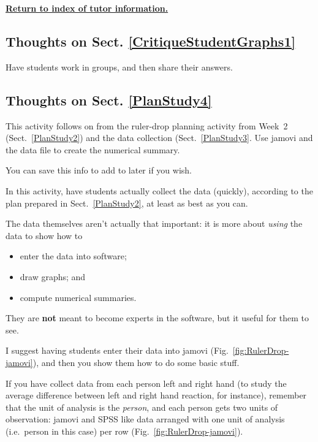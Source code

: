 \documentclass[
  11pt,
  a4paper,
  krantz2]{krantz}
\providecommand{\tightlist}{%
  \setlength{\itemsep}{0pt}\setlength{\parskip}{0pt}}
\begin{document}
\href{TutorInfo.html}{\textbf{Return to index of tutor information.}}

\subsection{Thoughts on Sect. \ref{CritiqueStudentGraphs1}}\label{thoughts-on-sect.-refcritiquestudentgraphs1}

Have students work in groups, and then share their answers.

\subsection{Thoughts on Sect. \ref{PlanStudy4}}\label{thoughts-on-sect.-refplanstudy4}

This activity follows on from the ruler-drop planning activity from Week~2 (Sect.~\ref{PlanStudy2}) and the data collection (Sect.~\ref{PlanStudy3}.
Use jamovi and the data file to create the numerical summary.

You can save this info to add to later if you wish.

In this activity, have students actually collect the data (quickly), according to the plan prepared in Sect.~\ref{PlanStudy2}, at least as best as you can.

The data themselves aren't actually that important: it is more about \emph{using} the data to show how to

\begin{itemize}
\tightlist
\item
  enter the data into software;
\item
  draw graphs; and
\item
  compute numerical summaries.
\end{itemize}

They are \textbf{not} meant to become experts in the software, but it useful for them to see.

I suggest having students enter their data into jamovi (Fig.~\ref{fig:RulerDrop-jamovi}), and then you show them how to do some basic stuff.

If you have collect data from each person left and right hand (to study the average difference between left and right hand reaction, for instance), remember that the unit of analysis is the \emph{person}, and each person gets two units of observation: jamovi and SPSS like data arranged with one unit of analysis (i.e.~person in this case) per row
(Fig.~\ref{fig:RulerDrop-jamovi}).
\end{document}
